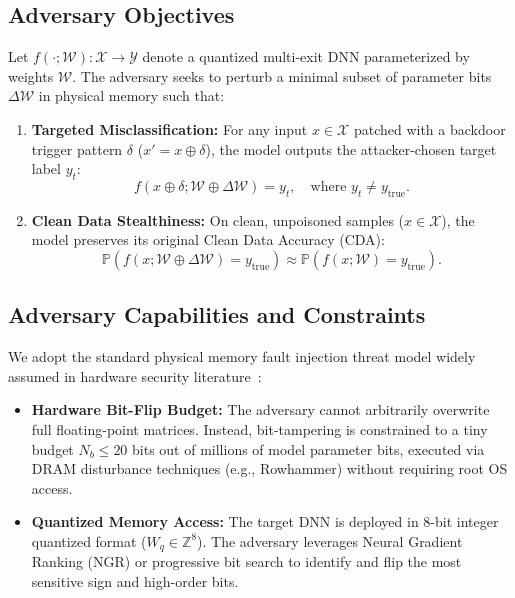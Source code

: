 \documentclass[conference,10pt]{IEEEtran}
\begin{document}
\subsection{Adversary Objectives}
Let $f(\cdot; \mathcal{W}): \mathcal{X} \to \mathcal{Y}$ denote a quantized multi-exit DNN parameterized by weights $\mathcal{W}$. The adversary seeks to perturb a minimal subset of parameter bits $\Delta \mathcal{W}$ in physical memory such that:
\begin{enumerate}
    \item \textbf{Targeted Misclassification:} For any input $x \in \mathcal{X}$ patched with a backdoor trigger pattern $\delta$ ($x' = x \oplus \delta$), the model outputs the attacker-chosen target label $y_t$:
    \begin{equation}
        f(x \oplus \delta; \mathcal{W} \oplus \Delta \mathcal{W}) = y_t, \quad \text{where } y_t \neq y_{\text{true}}.
    \end{equation}
    \item \textbf{Clean Data Stealthiness:} On clean, unpoisoned samples ($x \in \mathcal{X}$), the model preserves its original Clean Data Accuracy (CDA):
    \begin{equation}
        \mathbb{P}\left(f(x; \mathcal{W} \oplus \Delta \mathcal{W}) = y_{\text{true}}\right) \approx \mathbb{P}\left(f(x; \mathcal{W}) = y_{\text{true}}\right).
    \end{equation}
\end{enumerate}

\subsection{Adversary Capabilities and Constraints}
We adopt the standard physical memory fault injection threat model widely assumed in hardware security literature~\cite{rakin2020tbt, wang2023aegis}:
\begin{itemize}
    \item \textbf{Hardware Bit-Flip Budget:} The adversary cannot arbitrarily overwrite full floating-point matrices. Instead, bit-tampering is constrained to a tiny budget $N_b \le 20$ bits out of millions of model parameter bits, executed via DRAM disturbance techniques (e.g., Rowhammer) without requiring root OS access.
    \item \textbf{Quantized Memory Access:} The target DNN is deployed in 8-bit integer quantized format ($W_q \in \mathbb{Z}^8$). The adversary leverages Neural Gradient Ranking (NGR) or progressive bit search to identify and flip the most sensitive sign and high-order bits.
\end{itemize}
\end{document}
